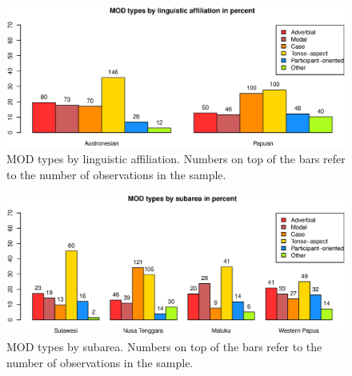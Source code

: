 \begin{figure}
\includegraphics[width=\columnwidth]{figures/MOD_Family.eps}
\caption[MOD types by linguistic affiliation]{MOD types by linguistic affiliation. Numbers on top of the bars refer to the number of observations in the sample.}\label{fig:mod-family}
\end{figure}
\begin{figure}
\includegraphics[width=\columnwidth]{figures/MOD_Group.eps}
\caption[MOD types by subarea]{MOD types by subarea. Numbers on top of the bars refer to the number of observations in the sample.}\label{fig:mod-group}
\end{figure}



